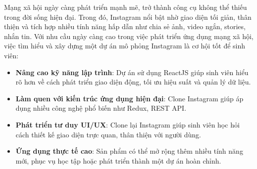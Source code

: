 
\vspace{0.5cm} %

Mạng xã hội ngày càng phát triển mạnh mẽ, trở thành công cụ không thể thiếu trong đời sống hiện đại. Trong đó, Instagram nổi bật nhờ giao diện tối giản, thân thiện và tích hợp nhiều tính năng hấp dẫn như chia sẻ ảnh, video ngắn, stories, nhắn tin. Với nhu cầu ngày càng cao trong việc phát triển ứng dụng mạng xã hội, việc tìm hiểu và xây dựng một dự án mô phỏng Instagram là cơ hội tốt để sinh viên:

\begin{itemize}
    \renewcommand{\labelitemi}{-} %
    \item \textbf{Nâng cao kỹ năng lập trình}: Dự án sử dụng ReactJS giúp sinh viên hiểu rõ hơn về cách phát triển giao diện động, tối ưu hiệu suất và quản lý dữ liệu.
    \item \textbf{Làm quen với kiến trúc ứng dụng hiện đại}: Clone Instagram giúp áp dụng nhiều công nghệ phổ biến như Redux, REST API.
    \item \textbf{Phát triển tư duy UI/UX}: Clone lại Instagram giúp sinh viên học hỏi cách thiết kế giao diện trực quan, thân thiện với người dùng.
    \item \textbf{Ứng dụng thực tế cao}: Sản phẩm có thể mở rộng thêm nhiều tính năng mới, phục vụ học tập hoặc phát triển thành một dự án hoàn chỉnh.
\end{itemize}
